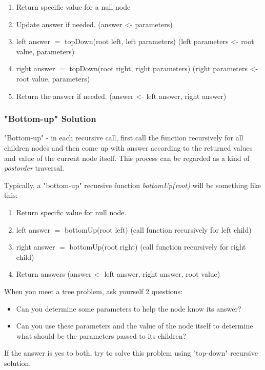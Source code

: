 \documentclass[10pt]{amsart}
\begin{document}
\begin{enumerate}
	\item Return specific value for a null node
	\item Update answer if needed. (answer <- parameters)
	\item left answer $=$ topDown(root left, left parameters) (left parameters <- root value, parameters)
	\item right answer $=$ topDown(root right, right parameters) (right parameters <- root value, parameters)
	\item Return the answer if needed. (answer <- left answer, right answer)
\end{enumerate}

\subsubsection{"Bottom-up" Solution}

"Bottom-up" - in each recursive call, first call the function recursively for all children nodes and then come up with answer according to the returned values and value of the current node itself. This process can be regarded as a kind of \emph{postorder} traversal.

Typically, a "bottom-up" recursive function \emph{bottomUp(root)} will be something like this:

\begin{enumerate}
	\item Return specific value for null node.
	\item left answer $=$ bottomUp(root left) (call function recursively for left child)
	\item right answer $=$ bottomUp(root right) (call function recursively for right child)
	\item Return answers (answer <- left answer, right answer, root value)
\end{enumerate}

When you meet a tree problem, ask yourself 2 questions: 
\begin{itemize}
	\item Can you determine some parameters to help the node know its answer?
	\item Can you use these parameters and the value of the node itself to determine what should be the parameters passed to its children?
\end{itemize}
If the answer is yes to both, try to solve this problem using "top-down" recursive solution.
\end{document}
